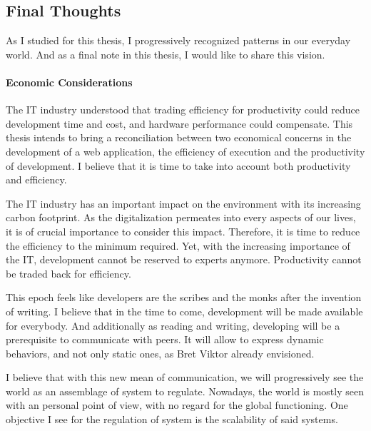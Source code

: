 

\subsection{Final Thoughts}

As I studied for this thesis, I progressively recognized patterns in our everyday world.
And as a final note in this thesis, I would like to share this vision.

\paragraph{Economic Considerations}

The IT industry understood that trading efficiency for productivity could reduce development time and cost, and hardware performance could compensate.
This thesis intends to bring a reconciliation between two economical concerns in the development of a web application, the efficiency of execution and the productivity of development.
I believe that it is time to take into account both productivity and efficiency.

The IT industry has an important impact on the environment with its increasing carbon footprint.
As the digitalization permeates into every aspects of our lives, it is of crucial importance to consider this impact.
Therefore, it is time to reduce the efficiency to the minimum required.
Yet, with the increasing importance of the IT, development cannot be reserved to experts anymore.
Productivity cannot be traded back for efficiency.


This epoch feels like developers are the scribes and the monks after the invention of writing.
I believe that in the time to come, development will be made available for everybody.
And additionally as reading and writing, developing will be a prerequisite to communicate with peers.
It will allow to express dynamic behaviors, and not only static ones, as Bret Viktor already envisioned.

I believe that with this new mean of communication, we will progressively see the world as an assemblage of system to regulate.
Nowadays, the world is mostly seen with an personal point of view, with no regard for the global functioning.
One objective I see for the regulation of system is the scalability of said systems.


